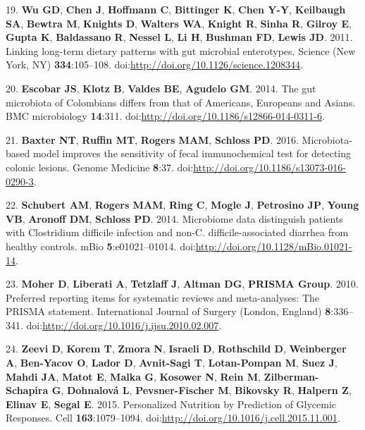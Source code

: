 \documentclass[12pt,]{article}
\begin{document}
19. \textbf{Wu GD}, \textbf{Chen J}, \textbf{Hoffmann C},
\textbf{Bittinger K}, \textbf{Chen Y-Y}, \textbf{Keilbaugh SA},
\textbf{Bewtra M}, \textbf{Knights D}, \textbf{Walters WA},
\textbf{Knight R}, \textbf{Sinha R}, \textbf{Gilroy E}, \textbf{Gupta
K}, \textbf{Baldassano R}, \textbf{Nessel L}, \textbf{Li H},
\textbf{Bushman FD}, \textbf{Lewis JD}. 2011. Linking long-term dietary
patterns with gut microbial enterotypes. Science (New York, NY)
\textbf{334}:105--108. doi:\url{http://doi.org/10.1126/science.1208344}.

20. \textbf{Escobar JS}, \textbf{Klotz B}, \textbf{Valdes BE},
\textbf{Agudelo GM}. 2014. The gut microbiota of Colombians differs from
that of Americans, Europeans and Asians. BMC microbiology
\textbf{14}:311. doi:\url{http://doi.org/10.1186/s12866-014-0311-6}.

21. \textbf{Baxter NT}, \textbf{Ruffin MT}, \textbf{Rogers MAM},
\textbf{Schloss PD}. 2016. Microbiota-based model improves the
sensitivity of fecal immunochemical test for detecting colonic lesions.
Genome Medicine \textbf{8}:37.
doi:\url{http://doi.org/10.1186/s13073-016-0290-3}.

22. \textbf{Schubert AM}, \textbf{Rogers MAM}, \textbf{Ring C},
\textbf{Mogle J}, \textbf{Petrosino JP}, \textbf{Young VB},
\textbf{Aronoff DM}, \textbf{Schloss PD}. 2014. Microbiome data
distinguish patients with Clostridium difficile infection and non-C.
difficile-associated diarrhea from healthy controls. mBio
\textbf{5}:e01021--01014.
doi:\url{http://doi.org/10.1128/mBio.01021-14}.

23. \textbf{Moher D}, \textbf{Liberati A}, \textbf{Tetzlaff J},
\textbf{Altman DG}, \textbf{PRISMA Group}. 2010. Preferred reporting
items for systematic reviews and meta-analyses: The PRISMA statement.
International Journal of Surgery (London, England) \textbf{8}:336--341.
doi:\url{http://doi.org/10.1016/j.ijsu.2010.02.007}.

24. \textbf{Zeevi D}, \textbf{Korem T}, \textbf{Zmora N},
\textbf{Israeli D}, \textbf{Rothschild D}, \textbf{Weinberger A},
\textbf{Ben-Yacov O}, \textbf{Lador D}, \textbf{Avnit-Sagi T},
\textbf{Lotan-Pompan M}, \textbf{Suez J}, \textbf{Mahdi JA},
\textbf{Matot E}, \textbf{Malka G}, \textbf{Kosower N}, \textbf{Rein M},
\textbf{Zilberman-Schapira G}, \textbf{Dohnalová L},
\textbf{Pevsner-Fischer M}, \textbf{Bikovsky R}, \textbf{Halpern Z},
\textbf{Elinav E}, \textbf{Segal E}. 2015. Personalized Nutrition by
Prediction of Glycemic Responses. Cell \textbf{163}:1079--1094.
doi:\url{http://doi.org/10.1016/j.cell.2015.11.001}.
\end{document}

